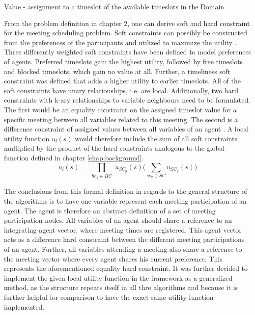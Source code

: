 \begin{hardconstraint2}
Value - assignment to a timeslot of the available timeslots in the Domain
\end{hardconstraint2}
From the problem definition in chapter 2, one can derive soft and hard constraint for the meeting scheduling problem. Soft constraints can possibly be constructed from the preferences of the participants and utilized to maximize the utility \cite{Franzin}. Three differently weighted soft constraints have been defined to model preferences of agents. Preferred timeslots gain the highest utility, followed by free timeslots and blocked timeslots, which gain no value at all. Further, a timeliness soft constraint was defined that adds a higher utility to earlier timeslots. All of the soft constraints have unary relationships, i.e. are local. %
Additionally, two hard constraints with k-ary relationships to variable neighbours need to be formulated. The first would be an equality constraint on the assigned timeslot value for a specific meeting between all variables related to this meeting. The second is a difference constraint of assigned values between all variables of an agent \cite{Farinelli} \cite{Scheduling}.
A local utility function \(u_{l}(s)\) would therefore include the sum of all soft constraints multiplied by the product of the hard constraints analogous to the global function defined in chapter {\ref{chap:background}}. 
\[ u_{l}(s) = \prod_{\substack{hc_{k} \in HC}} u_{SC_{g}}(s) \bigg( \sum_{sc_{k} \in SC} u_{SC_{g}}(s) \bigg)\] 

The conclusions from this formal definition in regards to the general structure of the algorithms is to have one variable represent each meeting participation of an agent. The agent is therefore an abstract definition of a set of meeting participation nodes. All variables of an agent should share a reference to an integrating agent vector, where meeting times are registered. This agent vector acts as a difference hard constraint between the different meeting participations of an agent. Further, all variables attending a meeting also share a reference to the meeting vector where every agent shares his current preference. This represents the aforementioned equality hard constraint. It was further decided to implement the given local utility function in the framework as a generalized method, as the structure repeats itself in all thre algorithms and because it is further helpful for comparison to have the exact same utility function implemented.

